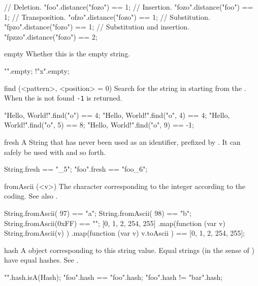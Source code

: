 \begin{urbiscriptapi}
\begin{urbiassert}
// Deletion.
"foo".distance("fozo") == 1;
// Insertion.
"fozo".distance("foo") == 1;
// Transposition.
"ofzo".distance("fozo") == 1;
// Substitution.
"fpzo".distance("fozo") == 1;
// Substitution and insertion.
"fpzzo".distance("fozo") == 2;
\end{urbiassert}


\item[empty] Whether this is the empty string.
\begin{urbiassert}
  "".empty;
!"x".empty;
\end{urbiassert}


\item[find](<pattern>, <position> = 0)%
  Search for the  string in \this starting from the
  .  When the  is not found \lstinline|-1| is
  returned.
\begin{urbiassert}
"Hello, World!".find("o")    == 4;
"Hello, World!".find("o", 4) == 4;
"Hello, World!".find("o", 5) == 8;
"Hello, World!".find("o", 9) == -1;
\end{urbiassert}


\item[fresh] A String that has never been used as an identifier, prefixed by
  \this.  It can safely be used with  and so forth.
\begin{urbiassert}
String.fresh == "_5";
"foo".fresh == "foo_6";
\end{urbiassert}


\item[fromAscii](<v>) The character corresponding to the integer 
  according to the  coding.  See also .
\begin{urbiassert}
String.fromAscii(  97) == "a";
String.fromAscii(  98) == "b";
String.fromAscii(0xFF) == "\xff";
[0, 1, 2, 254, 255]
  .map(function (var v) { String.fromAscii(v) })
  .map(function (var v) { v.toAscii })
  == [0, 1, 2, 254, 255];
\end{urbiassert}


\item[hash]%
  A  object corresponding to this string value.  Equal
  strings (in the sense of ) have equal hashes.  See
  .

\begin{urbiassert}
"".hash.isA(Hash);
"foo".hash == "foo".hash;
"foo".hash != "bar".hash;
\end{urbiassert}



\end{urbiscriptapi}
